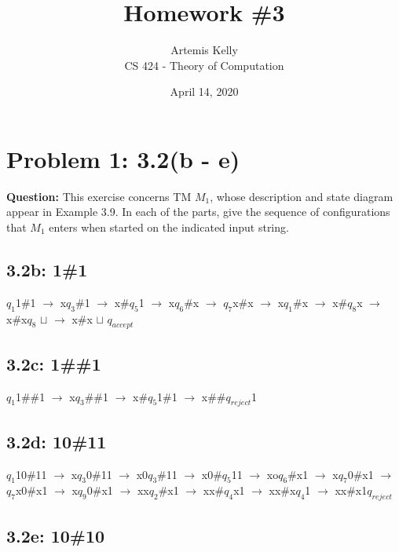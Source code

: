 \documentclass[12pt]{article}
\title{Homework \#3} %
\author{Artemis Kelly\\ %
CS 424 - Theory of Computation\\ %
}
\date{April 14, 2020} %
\begin{document}
\setlength{\droptitle}{-5em}    
\maketitle


\section*{Problem 1: 3.2(b - e)}
{\bfseries Question:} This exercise concerns TM $M_1$, whose description and state diagram appear in Example 3.9. In each of the parts, give the sequence of configurations that $M_1$ enters when started on the indicated input string.

\subsection*{3.2b: 1\#1}

$q_1$1\#1 $\xrightarrow{}$ x$q_3$\#1 $\xrightarrow{}$ x\#$q_5$1 $\xrightarrow{}$ x$q_6$\#x $\xrightarrow{}$ $q_7$x\#x $\xrightarrow{}$ x$q_1$\#x $\xrightarrow{}$ x\#$q_8$x $\xrightarrow{}$ x\#x$q_8$ $\sqcup$ $\xrightarrow{}$ x\#x $\sqcup$ $q_{accept}$ 

\subsection*{3.2c: 1\#\#1}

$q_1$1\#\#1 $\xrightarrow{}$ x$q_3$\#\#1 $\xrightarrow{}$ x\#$q_5$1\#1 $\xrightarrow{}$ x\#\#$q_{reject}$1

\subsection*{3.2d: 10\#11}

$q_1$10\#11 $\xrightarrow{}$ x$q_3$0\#11 $\xrightarrow{}$ x0$q_3$\#11 $\xrightarrow{}$ x0\#$q_5$11 $\xrightarrow{}$ xo$q_6$\#x1 $\xrightarrow{}$ x$q_7$0\#x1 $\xrightarrow{}$ $q_7$x0\#x1 $\xrightarrow{}$ x$q_9$0\#x1 $\xrightarrow{}$ xx$q_2$\#x1 $\xrightarrow{}$ xx\#$q_4$x1 $\xrightarrow{}$ xx\#x$q_4$1 $\xrightarrow{}$ xx\#x1$q_{reject}$

\subsection*{3.2e: 10\#10}
\end{document}
